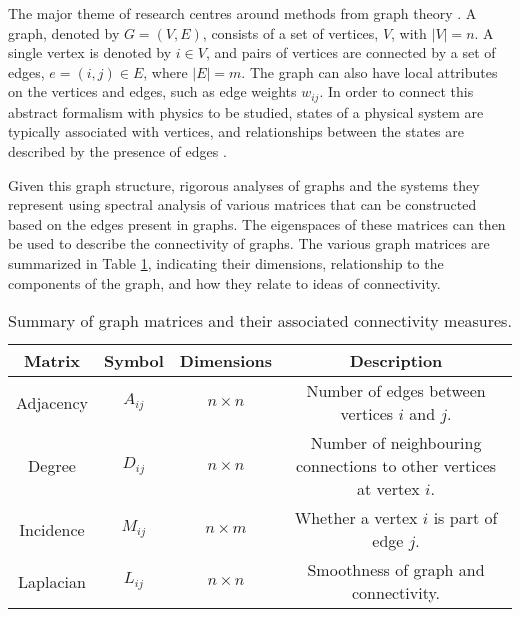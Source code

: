 \documentclass[12pt,letterpaper]{article}
\title{\large \doctitle}
\author{}
\date{}%
\begin{document}
\maketitle
\thispagestyle{fancy}
\singlespacing

The major theme of research centres around methods from graph theory \cite{West2001,Newman2010}. A graph, denoted by $G = (V,E)$, consists of a set of vertices, $V$, with $|V| = n$. A single vertex is denoted by  $ i \in V$, and pairs of vertices are connected by a set of edges, $e=(i,j) \in E$, where $|E| = m$. The graph can also have local attributes on the vertices and edges, such as edge weights $w_{ij}$. In order to connect this abstract formalism with physics to be studied, states of a physical system are typically associated with vertices, and relationships between the states are described by the presence of edges \cite{Banerjee2019}.

Given this graph structure, rigorous analyses of graphs and the systems they represent using spectral analysis of various matrices that can be constructed based on the edges present in graphs. The eigenspaces of these matrices can then be used to describe the connectivity of graphs. The various graph matrices are summarized in Table \ref{tab:graphmatrices}, indicating their dimensions, relationship to the components of the graph, and how they relate to ideas of connectivity.
 
\begin{table}[htb!]
    \centering
    \caption{Summary of graph matrices and their associated connectivity measures.}
    \label{tab:graphmatrices}
    \begin{tabular}{|c|c|c|c|} \hline
        Matrix & Symbol & Dimensions &  Description            \\ \hline
        Adjacency & $A_{ij}$ & $n \times n$ & Number of edges between vertices $i$ and $j$. \\ \hline
        Degree & $D_{ij}$ & $n\times n$ & Number of neighbouring connections to other vertices at vertex $i$. \\ \hline
        Incidence & $M_{ij}$ & $n \times m$ & Whether a vertex $i$ is part of edge $j$. \\ \hline
        Laplacian & $L_{ij}$ & $n \times n$ & Smoothness of graph and connectivity. \\ \hline
    \end{tabular}
\end{table}
\end{document}
